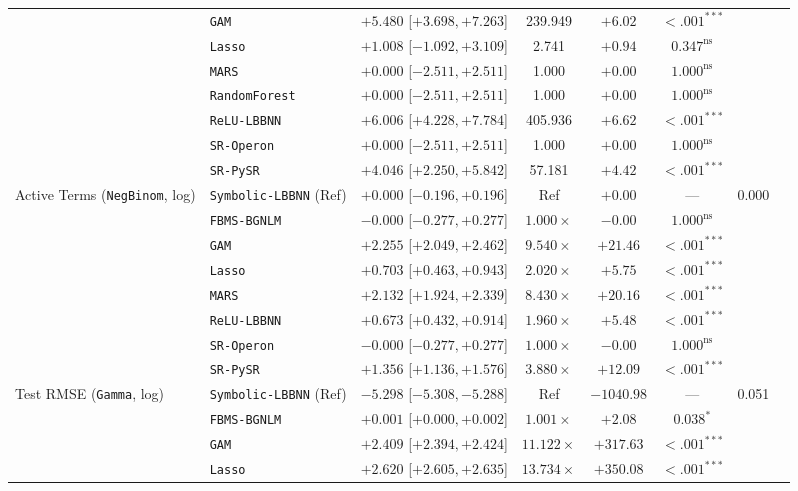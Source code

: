 \begin{table}[htbp]
{{\begin{tabular}{llcccccc}
 & \texttt{GAM} & $+5.480$ [$+3.698, +7.263$] & 239.949 & $+6.02$ & $<.001^{***}$ &  \\
 & \texttt{Lasso} & $+1.008$ [$-1.092, +3.109$] & 2.741 & $+0.94$ & $0.347^{\text{ns}}$ &  \\
 & \texttt{MARS} & $+0.000$ [$-2.511, +2.511$] & 1.000 & $+0.00$ & $1.000^{\text{ns}}$ &  \\
 & \texttt{RandomForest} & $+0.000$ [$-2.511, +2.511$] & 1.000 & $+0.00$ & $1.000^{\text{ns}}$ &  \\
 & \texttt{ReLU-LBBNN} & $+6.006$ [$+4.228, +7.784$] & 405.936 & $+6.62$ & $<.001^{***}$ &  \\
 & \texttt{SR-Operon} & $+0.000$ [$-2.511, +2.511$] & 1.000 & $+0.00$ & $1.000^{\text{ns}}$ &  \\
 & \texttt{SR-PySR} & $+4.046$ [$+2.250, +5.842$] & 57.181 & $+4.42$ & $<.001^{***}$ &  \\
\midrule
Active Terms (\texttt{NegBinom}, log) & \texttt{Symbolic-LBBNN} (Ref) & $+0.000$ [$-0.196, +0.196$] & Ref & $+0.00$ & --- & 0.000 \\
 & \texttt{FBMS-BGNLM} & $-0.000$ [$-0.277, +0.277$] & $1.000\times$ & $-0.00$ & $1.000^{\text{ns}}$ &  \\
 & \texttt{GAM} & $+2.255$ [$+2.049, +2.462$] & $9.540\times$ & $+21.46$ & $<.001^{***}$ &  \\
 & \texttt{Lasso} & $+0.703$ [$+0.463, +0.943$] & $2.020\times$ & $+5.75$ & $<.001^{***}$ &  \\
 & \texttt{MARS} & $+2.132$ [$+1.924, +2.339$] & $8.430\times$ & $+20.16$ & $<.001^{***}$ &  \\
 & \texttt{ReLU-LBBNN} & $+0.673$ [$+0.432, +0.914$] & $1.960\times$ & $+5.48$ & $<.001^{***}$ &  \\
 & \texttt{SR-Operon} & $-0.000$ [$-0.277, +0.277$] & $1.000\times$ & $-0.00$ & $1.000^{\text{ns}}$ &  \\
 & \texttt{SR-PySR} & $+1.356$ [$+1.136, +1.576$] & $3.880\times$ & $+12.09$ & $<.001^{***}$ &  \\
\midrule
Test RMSE (\texttt{Gamma}, log) & \texttt{Symbolic-LBBNN} (Ref) & $-5.298$ [$-5.308, -5.288$] & Ref & $-1040.98$ & --- & 0.051 \\
 & \texttt{FBMS-BGNLM} & $+0.001$ [$+0.000, +0.002$] & $1.001\times$ & $+2.08$ & $0.038^{*}$ &  \\
 & \texttt{GAM} & $+2.409$ [$+2.394, +2.424$] & $11.122\times$ & $+317.63$ & $<.001^{***}$ &  \\
 & \texttt{Lasso} & $+2.620$ [$+2.605, +2.635$] & $13.734\times$ & $+350.08$ & $<.001^{***}$ &  \\

\end{tabular}}}
\end{table}
